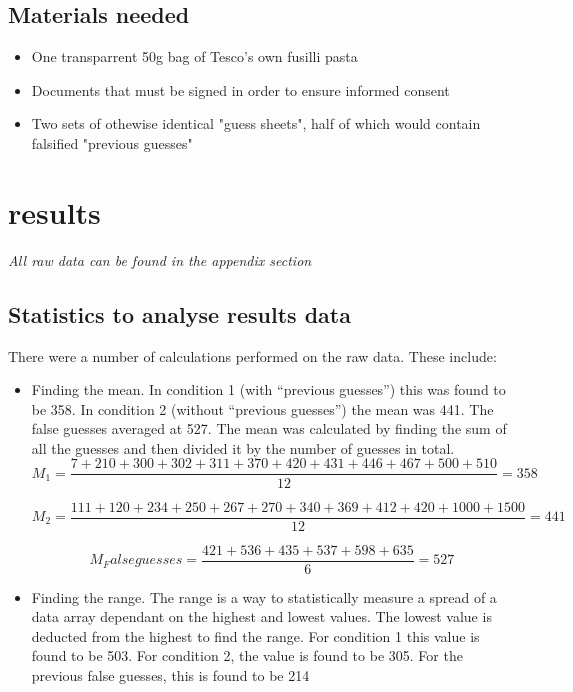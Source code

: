 \documentclass{report}
\begin{document}
\subsection{Materials needed}
\begin{itemize}
  \item One transparrent 50g bag of Tesco's own fusilli pasta
  \item Documents that must be signed in order to ensure informed consent
  \item Two sets of othewise identical "guess sheets", half of which would contain falsified "previous guesses"
\end{itemize}
\section{results}
\textit{All raw data can be found in the appendix section}
\subsection{Statistics to analyse results data}
There were a number of calculations performed on the raw data. These include:
\begin{itemize}
\item Finding the mean. In condition 1 (with “previous guesses”) this was found to be 358. In condition 2 (without “previous guesses”) the mean was 441. The false guesses averaged at 527. The mean was calculated by finding the sum of all the guesses and then divided it by the number of guesses in total.
\begin{displaymath}
M_1 = \frac{7+210+300+302+311+370+420+431+446+467+500+510}{12} = 358
\end{displaymath}

\begin{displaymath}
M_2 = \frac{111+120+234+250+267+270+340+369+412+420+1000+1500}{12} = 441
\end{displaymath}

\begin{displaymath}
M_Falseguesses = \frac{421+536+435+537+598+635}{6} = 527
\end{displaymath}

\item Finding the range. The range is a way to statistically measure a spread of a data array dependant on the highest and lowest values. The lowest value is deducted from the highest to find the range. For condition 1 this value is found to be 503. For condition 2, the value is found to be 305. For the previous false guesses, this is found to be 214
\end{itemize}
\end{document}
